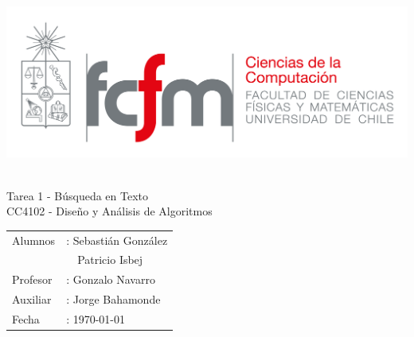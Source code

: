 \documentclass[14pt,letterpaper,hidelinks]{extarticle}
\begin{document}
\thispagestyle{empty}
\renewcommand*\listtablename{Índice de tablas}
\renewcommand{\contentsname}{\'Indice}
\renewcommand*{\refname}{}

\newpage
\pagestyle{fancy}
\fancyhf{}
\hbox{\includegraphics[scale=0.3]{img/fcfm_dcc_png.png} }
\vspace*{4cm}
\begin{center}
\Huge  {Tarea 1 - Búsqueda en Texto}\\
\vspace{1cm}
\Large {CC4102 - Diseño y Análisis de Algoritmos}\\
\end{center}

\vfill
\begin{flushright}
\begin{table}[h]
	\large
  \raggedleft
	\begin{tabular}{ll}
		Alumnos&: Sebastián González\\
				&\ \ Patricio Isbej\\
		Profesor&: Gonzalo Navarro\\
		Auxiliar&: Jorge Bahamonde\\
		Fecha&: \today
	\end{tabular}
\end{table}
\end{flushright}

\newpage
\pagestyle{fancy}
\fancyhf{}

\fancyhead[R]{\small \rm \textbf{\thepage}} %


\end{document}
